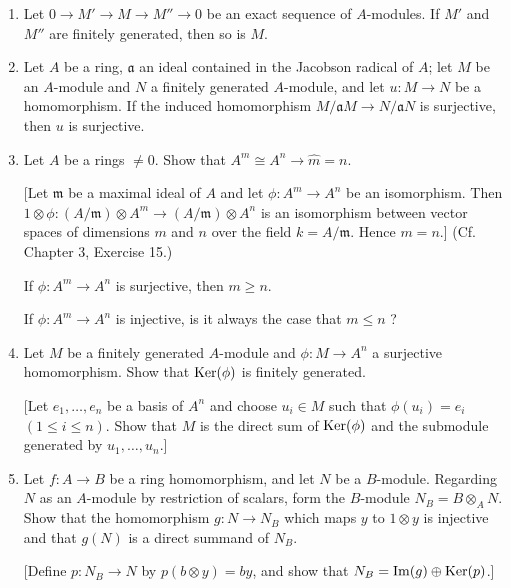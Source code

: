 \documentclass{standalone}
\theoremstyle{definition}
\theoremstyle{remark}
\begin{document}
\begin{enumerate}[series=exc2]
  \item Let $0 \to M' \to M \to M'' \to 0$ be an exact sequence of $A$-modules.
      If $M'$ and $M''$ are finitely generated, then so is $M$.

  \item Let $A$ be a ring, $\mathfrak{a}$ an ideal contained in the Jacobson
        radical of $A$; let $M$ be an $A$-module and $N$ a finitely generated
        $A$-module, and let $u: M \to N$ be a homomorphism. If the induced
        homomorphism $M / \mathfrak{a} M \to N / \mathfrak{a} N$ is surjective,
        then $u$ is surjective.

  \item Let $A$ be a rings $\neq 0$. Show that
        $A^{m} \cong A^{n} \to \hat{m}=n$.

        [Let $\mathfrak{m}$ be a maximal ideal of $A$ and let $\phi: A^{m} \to A^{n}$
be an isomorphism. Then $1 \otimes \phi\colon (A / \mathfrak{m}) \otimes
A^{m} \to(A / \mathfrak{m}) \otimes A^{n}$ is an isomorphism between
vector spaces of dimensions $m$ and $n$ over the field $k=A /
\mathfrak{m}$. Hence $m=n$.] (Cf. Chapter 3, Exercise 15.)

If $\phi: A^{m} \to A^{n}$ is surjective, then $m \geqslant n$.

If $\phi: A^{m} \to A^{n}$ is injective, is it always the case that
$m \leqslant n$ ?
  \item Let $M$ be a finitely generated $A$-module and $\phi: M \to A^{n}$ a
        surjective homomorphism. Show that $\operatorname{Ker}(\phi)$ is finitely generated.

        [Let $e_{1}, \ldots, e_{n}$ be a basis of $A^{n}$ and choose $u_{i} \in M$ such
that $\phi(u_{i})=e_{i}$ $(1 \leqslant i \leqslant n)$. Show that $M$
is the direct sum of $\operatorname{Ker}(\phi)$ and the submodule generated by
$u_{1}, \ldots, u_{n}$.]

  \item Let $f\colon A \to B$ be a ring homomorphism, and let $N$ be a $B$-module.
        Regarding $N$ as an $A$-module by restriction of scalars, form the
        $B$-module $N_{B}=B \otimes_{A} N$. Show that the homomorphism
        $g: N \to N_{B}$ which maps $y$ to $1 \otimes y$ is injective and that
        $g(N)$ is a direct summand of $N_{B}$.

[Define $p: N_{B} \to N$ by $p(b \otimes y)=b y$, and show that
$N_{B}=\operatorname{Im}(g) \oplus \operatorname{Ker}(p)$.]
\end{enumerate}
\end{document}
